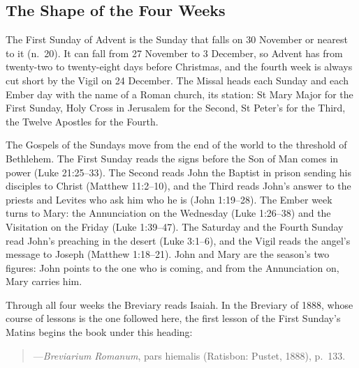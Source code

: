 \subsection{The Shape of the Four Weeks}\label{sec:shape}

The First Sunday of Advent is the Sunday that falls on 30 November or nearest to it (n.~20). It
can fall from 27 November to 3 December, so Advent has from twenty-two to twenty-eight days
before Christmas, and the fourth week is always cut short by the Vigil on 24 December. The
Missal heads each Sunday and each Ember day with the name of a Roman church, its station: St Mary
Major for the First Sunday, Holy Cross in Jerusalem for the Second, St Peter's for the Third, the
Twelve Apostles for the Fourth.

The Gospels of the Sundays move from the end of the world to the threshold of Bethlehem. The
First Sunday reads the signs before the Son of Man comes in power (Luke 21:25--33). The Second
reads John the Baptist in prison sending his disciples to Christ (Matthew 11:2--10), and the
Third reads John's answer to the priests and Levites who ask him who he is (John 1:19--28). The
Ember week turns to Mary: the Annunciation on the Wednesday (Luke 1:26--38) and the Visitation on
the Friday (Luke 1:39--47). The Saturday and the Fourth Sunday read John's preaching in the
desert (Luke 3:1--6), and the Vigil reads the angel's message to Joseph (Matthew 1:18--21). John
and Mary are the season's two figures: John points to the one who is coming, and from the
Annunciation on, Mary carries him.

Through all four weeks the Breviary reads Isaiah. In the Breviary of 1888, whose course of
lessons is the one followed here, the first lesson of the First Sunday's Matins begins the book
under this heading:

\begin{quote}
\par
{\smallskip\noindent\small ---\textit{Breviarium Romanum}, pars hiemalis (Ratisbon: Pustet,
1888), p.~133.\par}
\end{quote}

